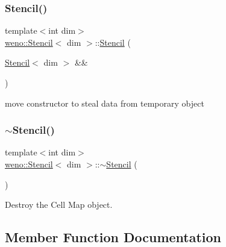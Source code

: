 \subsubsection{\texorpdfstring{Stencil()}{Stencil()}\hspace{0.1cm}{\footnotesize\ttfamily [3/3]}}
{\footnotesize\ttfamily template$<$int dim$>$ \\
\hyperlink{classweno_1_1_stencil}{weno\+::\+Stencil}$<$ dim $>$\+::\hyperlink{classweno_1_1_stencil}{Stencil} (\begin{DoxyParamCaption}\item[{\hyperlink{classweno_1_1_stencil}{Stencil}$<$ dim $>$ \&\&}]{ }\end{DoxyParamCaption})\hspace{0.3cm}{\ttfamily [default]}}



move constructor to steal data from temporary object 

\mbox{\label{classweno_1_1_stencil_adadca4d1773a270be6a84a0e9b7c7b0c}} 
\subsubsection{\texorpdfstring{$\sim$\+Stencil()}{~Stencil()}}
{\footnotesize\ttfamily template$<$int dim$>$ \\
\hyperlink{classweno_1_1_stencil}{weno\+::\+Stencil}$<$ dim $>$\+::$\sim$\hyperlink{classweno_1_1_stencil}{Stencil} (\begin{DoxyParamCaption}{ }\end{DoxyParamCaption})\hspace{0.3cm}{\ttfamily [default]}}



Destroy the Cell Map object. 



\subsection{Member Function Documentation}
\mbox{\label{classweno_1_1_stencil_ace32c426133dae0d0fcb0d35f687c0ef}} 
